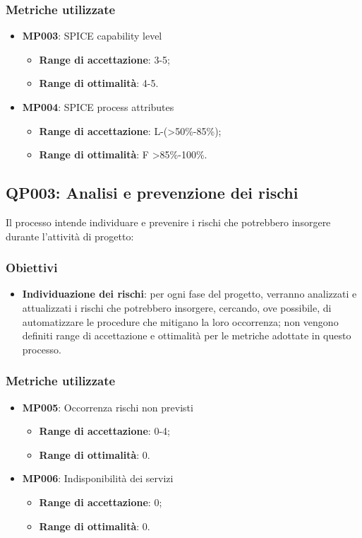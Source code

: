 \subsubsection{Metriche utilizzate}
\begin{itemize}
	\item \textbf{MP003}: SPICE capability level
	\begin{itemize}
		\item \textbf{Range di accettazione}: 3-5;
		\item \textbf{Range di ottimalità}: 4-5.
	\end{itemize}
	\item \textbf{MP004}: SPICE process attributes
	\begin{itemize}
		\item \textbf{Range di accettazione}: L-(>50\%-85\%);
		\item \textbf{Range di ottimalità}: F >85\%-100\%.
	\end{itemize}
\end{itemize}

\subsection{QP003: Analisi e prevenzione dei rischi}
Il processo intende individuare e prevenire i rischi che potrebbero insorgere durante l'attività di progetto:

\subsubsection{Obiettivi}
\begin{itemize}
	\item \textbf{Individuazione dei rischi}: per ogni fase del progetto, verranno analizzati e attualizzati i rischi che potrebbero insorgere, cercando, ove possibile, di automatizzare le procedure che mitigano la loro occorrenza; non vengono definiti range di accettazione e ottimalità per le metriche adottate in questo processo.
\end{itemize}

\subsubsection{Metriche utilizzate}
\begin{itemize}	
	\item \textbf{MP005}: Occorrenza rischi non previsti
	\begin{itemize}
		\item \textbf{Range di accettazione}: 0-4;
		\item \textbf{Range di ottimalità}: 0.
	\end{itemize}
	\item \textbf{MP006}: Indisponibilità dei servizi
	\begin{itemize}
		\item \textbf{Range di accettazione}: 0;
		\item \textbf{Range di ottimalità}: 0.
	\end{itemize}
\end{itemize}
